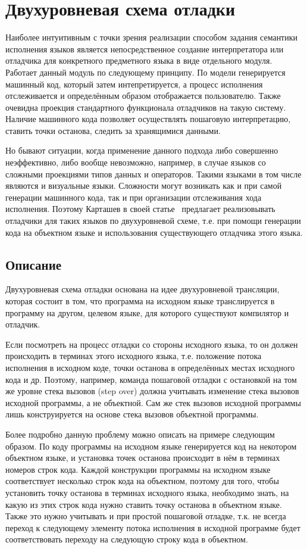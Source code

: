 \documentclass[a5paper]{article}
\begin{document}
\section{Двухуровневая схема отладки}

Наиболее интуитивным с точки зрения реализации способом задания семантики исполнения языков является непосредственное создание интерпретатора или отладчика для конкретного предметного языка в виде отдельного модуля. Работает данный модуль по следующему принципу. По модели генерируется машинный код, который затем интепретируется, а процесс исполнения отслеживается и определённым образом отображается пользователю. Также очевидна проекция стандартного функционала отладчиков на такую систему. Наличие машинного кода позволяет осуществлять пошаговую интерпретацию, ставить точки останова, следить за хранящимися данными.

Но бывают ситуации, когда применение данного подхода либо совершенно неэффективно, либо вообще невозможно, например, в случае языков со сложными проекциями типов данных и операторов. Такими языками в том числе являются и визуальные языки. Сложности могут возникать как и при самой генерации машинного кода, так и при организации отслеживания хода исполнения. Поэтому Карташев в своей статье~\cite{kartashev} предлагает реализовывать отладчики для таких языков по двухуровневой схеме, т.е. при помощи генерации кода на объектном языке и использования существующего отладчика этого языка.

\subsection{Описание}

Двухуровневая схема отладки основана на идее двухуровневой трансляции, которая состоит в том, что программа на исходном языке транслируется в программу на другом, целевом языке, для которого существуют компилятор и отладчик.

Если посмотреть на процесс отладки со стороны исходного языка, то он должен происходить в терминах этого исходного языка, т.е. положение потока исполнения в исходном коде, точки останова в определённых местах исходного кода и др. Поэтому, например, команда пошаговой отладки с остановкой на том же уровне стека вызовов (step over) должна учитывать изменение стека вызовов исходной программы, а не объектной. Сам же стек вызовов исходной программы лишь конструируется на основе стека вызовов объектной программы.

Более подробно данную проблему можно описать на примере следующим образом. По коду программы на исходном языке генерируется код на некотором объектном языке, и установка точек останова происходит в нём в терминах номеров строк кода. Каждой конструкции программы на исходном языке соответствует несколько строк кода на объектном, поэтому для того, чтобы установить точку останова в терминах исходного языка, необходимо знать, на какую из этих строк кода нужно ставить точку останова в объектном языке. Также это нужно учитывать и при простой пошаговой отладке, т.к. не всегда переход к следующему элементу потока исполнения в исходной программе будет соответствовать переходу на следующую строку кода в объектном.
\end{document}

